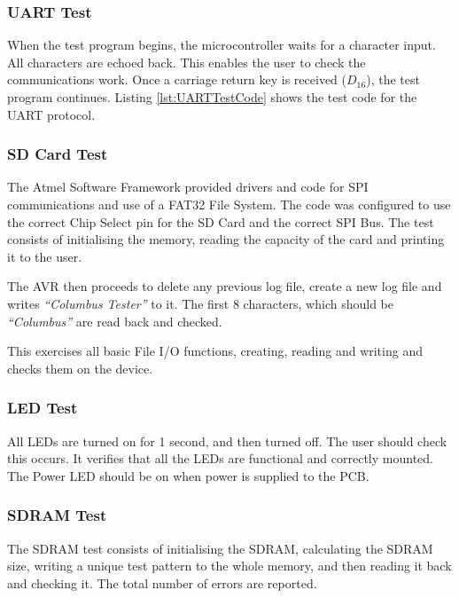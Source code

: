 \subsubsection{UART Test}\label{UART:Test}
When the test program begins, the microcontroller waits for a character input. All characters are echoed back. This enables the user to check the communications work. Once a carriage return key is received ($D_{16}$), the test program continues. Listing \ref{lst:UARTTestCode} shows the test code for the UART protocol.




\subsubsection{SD Card Test}\label{SD:Test}
The Atmel Software Framework \citep{Atmel:ASF} provided drivers and code for SPI communications and use of a FAT32 File System. The code was configured to use the correct Chip Select pin for the SD Card and the correct SPI Bus. The test consists of initialising the memory, reading the capacity of the card and printing it to the user. 

The AVR then proceeds to delete any previous log file, create a new log file and writes \textit{``Columbus Tester''} to it. The first 8 characters, which should be \textit{``Columbus''} are read back and checked.


This exercises all basic File I/O functions, creating, reading and writing and checks them on the device.

\subsubsection{LED Test}\label{LED:Test}
All LEDs are turned on for 1 second, and then turned off. The user should check this occurs. It verifies that all the LEDs are functional and correctly mounted. The Power LED should be on when power is supplied to the PCB. 

\subsubsection{SDRAM Test}\label{SDRAM:Test}
The SDRAM test consists of initialising the SDRAM, calculating the SDRAM size, writing a unique test pattern to the whole memory, and then reading it back and checking it. The total number of errors are reported. 

